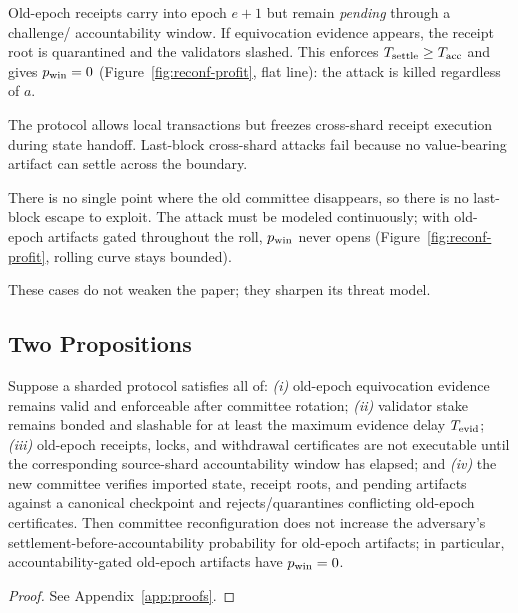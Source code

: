 \begin{counterexample}\label{cex:gated}
Old-epoch receipts carry into epoch $e{+}1$ but remain \emph{pending} through a challenge/
accountability window. If equivocation evidence appears, the receipt root is quarantined and the
validators slashed. This enforces $T_{\mathrm{settle}}\ge T_{\mathrm{acc}}$ and gives $p_{\mathrm{win}}=0$ (Figure~\ref{fig:reconf-profit},
flat line): the attack is killed regardless of $a$.
\end{counterexample}

\begin{counterexample}\label{cex:freeze}
The protocol allows local transactions but freezes cross-shard receipt execution during state
handoff. Last-block cross-shard attacks fail because no value-bearing artifact can settle across the
boundary.
\end{counterexample}

\begin{counterexample}\label{cex:rolling}
There is no single point where the old committee disappears, so there is no last-block escape to
exploit. The attack must be modeled continuously; with old-epoch artifacts gated throughout the roll,
$p_{\mathrm{win}}$ never opens (Figure~\ref{fig:reconf-profit}, rolling curve stays bounded).
\end{counterexample}

These cases do not weaken the paper; they sharpen its threat model.

\subsection{Two Propositions}
\label{sec:reconf-props}

\begin{proposition}\label{prop:reconf-safe}
Suppose a sharded protocol satisfies all of:
\emph{(i)} old-epoch equivocation evidence remains valid and enforceable after committee rotation;
\emph{(ii)} validator stake remains bonded and slashable for at least the maximum evidence delay
$T_{\mathrm{evid}}$;
\emph{(iii)} old-epoch receipts, locks, and withdrawal certificates are not executable until the
corresponding source-shard accountability window has elapsed; and
\emph{(iv)} the new committee verifies imported state, receipt roots, and pending artifacts against a
canonical checkpoint and rejects/quarantines conflicting old-epoch certificates.
Then committee reconfiguration does not increase the adversary's settlement-before-accountability
probability for old-epoch artifacts; in particular, accountability-gated old-epoch artifacts have
$p_{\mathrm{win}}=0$.
\end{proposition}
\begin{proof}
See Appendix~\ref{app:proofs}.
\end{proof}

